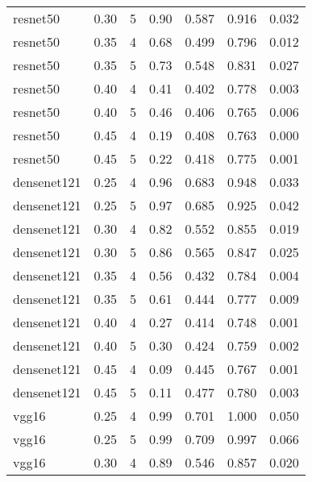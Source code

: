 \begin{longtable}{lrrrrrr}
   resnet50 & 0.30 &            5 &         0.90 &            0.587 &   0.916 &    0.032 \\
   resnet50 & 0.35 &            4 &         0.68 &            0.499 &   0.796 &    0.012 \\
   resnet50 & 0.35 &            5 &         0.73 &            0.548 &   0.831 &    0.027 \\
   resnet50 & 0.40 &            4 &         0.41 &            0.402 &   0.778 &    0.003 \\
   resnet50 & 0.40 &            5 &         0.46 &            0.406 &   0.765 &    0.006 \\
   resnet50 & 0.45 &            4 &         0.19 &            0.408 &   0.763 &    0.000 \\
   resnet50 & 0.45 &            5 &         0.22 &            0.418 &   0.775 &    0.001 \\
densenet121 & 0.25 &            4 &         0.96 &            0.683 &   0.948 &    0.033 \\
densenet121 & 0.25 &            5 &         0.97 &            0.685 &   0.925 &    0.042 \\
densenet121 & 0.30 &            4 &         0.82 &            0.552 &   0.855 &    0.019 \\
densenet121 & 0.30 &            5 &         0.86 &            0.565 &   0.847 &    0.025 \\
densenet121 & 0.35 &            4 &         0.56 &            0.432 &   0.784 &    0.004 \\
densenet121 & 0.35 &            5 &         0.61 &            0.444 &   0.777 &    0.009 \\
densenet121 & 0.40 &            4 &         0.27 &            0.414 &   0.748 &    0.001 \\
densenet121 & 0.40 &            5 &         0.30 &            0.424 &   0.759 &    0.002 \\
densenet121 & 0.45 &            4 &         0.09 &            0.445 &   0.767 &    0.001 \\
densenet121 & 0.45 &            5 &         0.11 &            0.477 &   0.780 &    0.003 \\
      vgg16 & 0.25 &            4 &         0.99 &            0.701 &   1.000 &    0.050 \\
      vgg16 & 0.25 &            5 &         0.99 &            0.709 &   0.997 &    0.066 \\
      vgg16 & 0.30 &            4 &         0.89 &            0.546 &   0.857 &    0.020 \\

\end{longtable}
